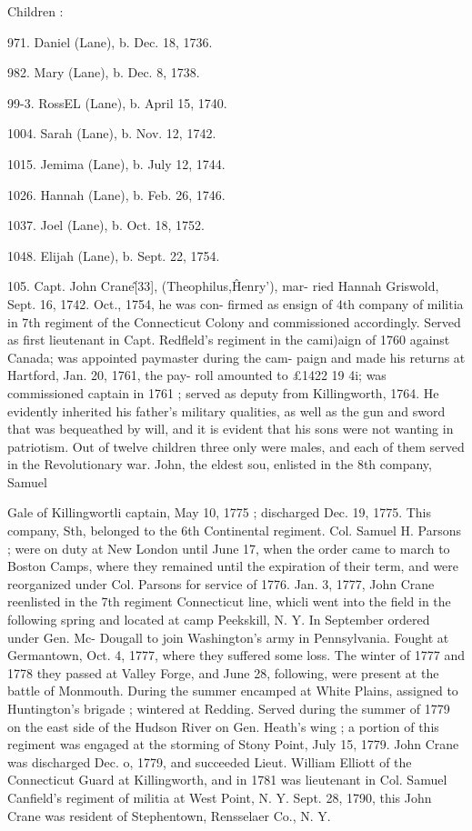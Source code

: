 \documentclass{book}
\begin{document}
Children : 

971. Daniel (Lane), b. Dec. 18, 1736. 

982. Mary (Lane), b. Dec. 8, 1738. 

99-3. RossEL (Lane), b. April 15, 1740. 

1004. Sarah (Lane), b. Nov. 12, 1742. 

1015. Jemima (Lane), b. July 12, 1744. 

1026. Hannah (Lane), b. Feb. 26, 1746. 

1037. Joel (Lane), b. Oct. 18, 1752. 

1048. Elijah (Lane), b. Sept. 22, 1754. 

105. Capt. John Crane\^ [33], (Theophilus,\^ Henry'), mar- 
ried Hannah Griswold, Sept. 16, 1742. Oct., 1754, he was con- 
firmed as ensign of 4th company of militia in 7th regiment of the 
Connecticut Colony and commissioned accordingly. Served as 
first lieutenant in Capt. Redfleld's regiment in the cami)aign of 
1760 against Canada; was appointed paymaster during the cam- 
paign and made his returns at Hartford, Jan. 20, 1761, the pay- 
roll amounted to £1422  19  4i; was commissioned captain in 
1761 ; served as deputy from Killingworth, 1764. He evidently 
inherited his father's military qualities, as well as the gun and 
sword that was bequeathed by will, and it is evident that his sons 
were not wanting in patriotism. Out of twelve children three 
only were males, and each of them served in the Revolutionary 
war. John, the eldest sou, enlisted in the 8th company, Samuel 




Gale of Killingwortli captain, May 10, 1775 ; discharged Dec. 
19, 1775. This company, Sth, belonged to the 6th Continental 
regiment. Col. Samuel H. Parsons ; were on duty at New London 
until June 17, when the order came to march to Boston Camps, 
where they remained until the expiration of their term, and were 
reorganized under Col. Parsons for service of 1776. Jan. 3, 
1777, John Crane reenlisted in the 7th regiment Connecticut line, 
whicli went into the field in the following spring and located at 
camp Peekskill, N. Y. In September ordered under Gen. Mc- 
Dougall to join Washington's army in Pennsylvania. Fought at 
Germantown, Oct. 4, 1777, where they suffered some loss. The 
winter of 1777 and 1778 they passed at Valley Forge, and June 
28, following, were present at the battle of Monmouth. During 
the summer encamped at White Plains, assigned to Huntington's 
brigade ; wintered at Redding. Served during the summer of 
1779 on the east side of the Hudson River on Gen. Heath's wing ; 
a portion of this regiment was engaged at the storming of Stony 
Point, July 15, 1779. John Crane was discharged Dec. o, 1779, 
and succeeded Lieut. William Elliott of the Connecticut Guard at 
Killingworth, and in 1781 was lieutenant in Col. Samuel Canfield's 
regiment of militia at West Point, N. Y. Sept. 28, 1790, this 
John Crane was resident of Stephentown, Rensselaer Co., N. Y. 
\end{document}

